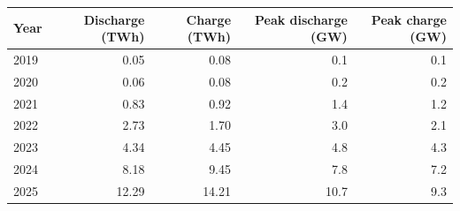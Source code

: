 \begin{tabular}{lrrrr}
\toprule
Year & Discharge (TWh) & Charge (TWh) & Peak discharge (GW) & Peak charge (GW) \\
\midrule
2019 & 0.05 & 0.08 & 0.1 & 0.1 \\
2020 & 0.06 & 0.08 & 0.2 & 0.2 \\
2021 & 0.83 & 0.92 & 1.4 & 1.2 \\
2022 & 2.73 & 1.70 & 3.0 & 2.1 \\
2023 & 4.34 & 4.45 & 4.8 & 4.3 \\
2024 & 8.18 & 9.45 & 7.8 & 7.2 \\
2025 & 12.29 & 14.21 & 10.7 & 9.3 \\
\bottomrule
\end{tabular}
